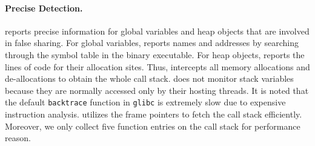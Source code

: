 \paragraph{Precise Detection.} \Cheetah{} reports precise information for global variables and heap objects that are involved in false sharing. For global variables, \Cheetah{} reports names and addresses by searching through the symbol table in the binary executable. For heap objects, \Cheetah{} reports the lines of code for their allocation sites. Thus, \Cheetah{} intercepts all memory allocations and de-allocations to obtain the whole call stack. 
\cheetah{} does not monitor stack variables because they are normally accessed only by their hosting threads. It is noted that the default \texttt{backtrace} function in \texttt{glibc} is extremely slow due to expensive instruction analysis. \cheetah{} utilizes the frame pointers to fetch the call stack efficiently. Moreover, we only collect five function entries on the call stack for performance reason.

 
